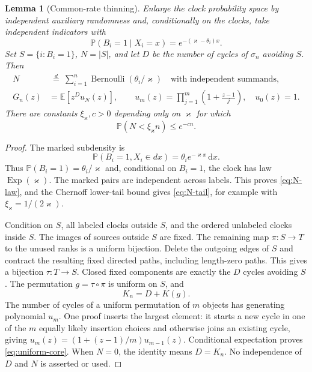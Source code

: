 \documentclass[11pt]{article}
\numberwithin{equation}{section}
\newtheorem{lemma}[theorem]{Lemma}
\theoremstyle{definition}
\theoremstyle{remark}
\newcommand{\E}{\mathbb E}
\newcommand{\Pp}{\mathbb P}
\newcommand{\dd}{\,\mathrm d}
\newcommand{\Exp}{\operatorname{Exp}}
\begin{document}
\begin{lemma}[Common-rate thinning]\label{lem:thinning}
Enlarge the clock probability space by independent auxiliary randomness and, conditionally on the clocks, take independent indicators with
\begin{equation}\label{eq:thinning}
 \Pp(B_i=1\mid X_i=x)=e^{-(\varkappa-\theta_i)x}.
\end{equation}
Set $S=\{i:B_i=1\}$, $N=|S|$, and let $D$ be the number of cycles of $\sigma_n$ avoiding $S$. Then
\begin{align}
 N&\ \overset d=\ \sum_{i=1}^n\operatorname{Bernoulli}(\theta_i/\varkappa)
     \quad\text{with independent summands},\label{eq:N-law}\\
 G_n(z)&=\E[z^D u_N(z)],\qquad
 u_m(z)=\prod_{j=1}^m\left(1+\frac{z-1}{j}\right),\quad u_0(z)=1.
 \label{eq:uniform-core}
\end{align}
There are constants $\xi_{\varkappa},c>0$ depending only on $\varkappa$ for which
\begin{equation}\label{eq:N-tail}
 \Pp(N<\xi_{\varkappa}n)\le e^{-cn}.
\end{equation}
\end{lemma}
\begin{proof}
The marked subdensity is
\[
 \Pp(B_i=1,X_i\in dx)=\theta_i e^{-\varkappa x}\dd x.
\]
Thus $\Pp(B_i=1)=\theta_i/\varkappa$ and, conditional on $B_i=1$, the clock has law $\Exp(\varkappa)$. The marked pairs are independent across labels. This proves \eqref{eq:N-law}, and the Chernoff lower-tail bound gives \eqref{eq:N-tail}, for example with $\xi_{\varkappa}=1/(2\varkappa)$.

Condition on $S$, all labeled clocks outside $S$, and the ordered unlabeled clocks inside $S$. The images of sources outside $S$ are fixed. The remaining map $\pi:S\to T$ to the unused ranks is a uniform bijection. Delete the outgoing edges of $S$ and contract the resulting fixed directed paths, including length-zero paths. This gives a bijection $\tau:T\to S$. Closed fixed components are exactly the $D$ cycles avoiding $S$. The permutation $g=\tau\circ\pi$ is uniform on $S$, and
\begin{equation}\label{eq:cycle-contraction}
 K_n=D+K(g).
\end{equation}
The number of cycles of a uniform permutation of $m$ objects has generating polynomial $u_m$. One proof inserts the largest element: it starts a new cycle in one of the $m$ equally likely insertion choices and otherwise joins an existing cycle, giving $u_m(z)=(1+(z-1)/m)u_{m-1}(z)$. Conditional expectation proves \eqref{eq:uniform-core}. When $N=0$, the identity means $D=K_n$. No independence of $D$ and $N$ is asserted or used.
\end{proof}
\end{document}
